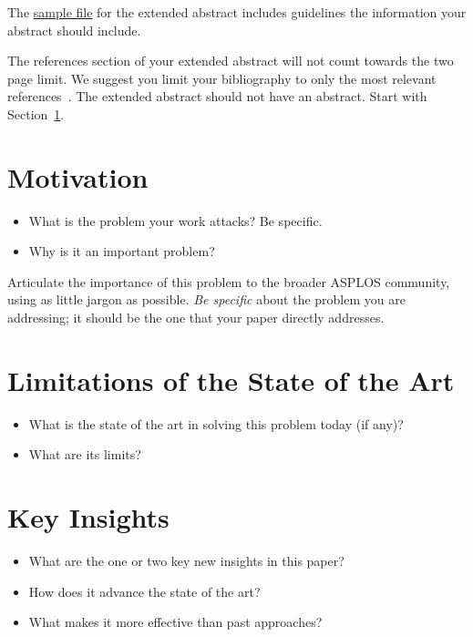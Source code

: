 \documentclass[pageno]{jpaper}
\begin{document}
The \href{ https://asplos-conference.org/wp-content/uploads/2020/06/asplos21-extended-abstract-template.pdf}{sample file} for the
extended abstract includes guidelines the information your abstract
should include. 



The references section of your extended abstract will not count
towards the two page limit. We suggest you limit your bibliography to
only the most relevant references~\cite{lamport94}.
The extended abstract should not have an abstract. Start with Section~\ref{sec:motivation}.

\section{Motivation}
\label{sec:motivation}


\begin{itemize}
\item What is the problem your work attacks? Be specific.
\item Why is it an important problem?
\end{itemize}

\vspace{1em}

\noindent
Articulate the importance of this problem to the broader ASPLOS
community, using as little jargon as possible. \emph{Be specific}
about the problem you are addressing; it should be the one that your
paper directly addresses.

\section{Limitations of the State of the Art}
\label{sec:limitations}

\begin{itemize}
\item What is the state of the art in solving this problem today (if any)?
\item What are its limits?
\end{itemize}

\section{Key Insights}
\label{sec:key-insights}

\begin{itemize}
\item What are the one or two key new insights in this paper?
\item How does it advance the state of the art?
\item What makes it more effective than past approaches?
\end{itemize}
\end{document}
